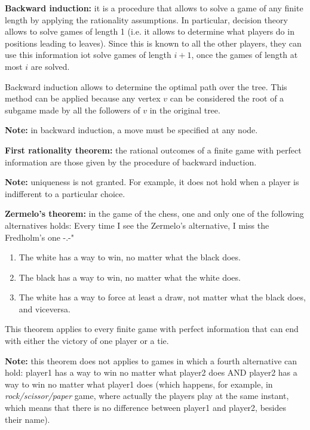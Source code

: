 \documentclass[pt11,a4paper,twoside,reqno,openright]{paper}
\begin{document}
\bigskip
\noindent \textbf{Backward induction:} it is a procedure that allows to solve 
a game of any finite length by applying the rationality assumptions. In 
particular, decision theory allows to solve games of length 1 (i.e. it allows 
to determine what players do in positions leading to leaves). Since this is 
known to all the other players, they can use this information iot solve games 
of length $i+1$, once the games of length at most $i$ are solved.

\noindent Backward induction allows to determine the optimal path over the tree. 
This method can be applied because any vertex $v$ can be considered the root of 
a subgame made by all the followers of $v$ in the original tree.

\noindent \textbf{Note:} in backward induction, a move must be specified at any 
node.

\bigskip
\noindent \textbf{First rationality theorem:} the rational outcomes of a finite 
game with perfect information are those given by the procedure of backward 
induction.

\noindent \textbf{Note:} uniqueness is not granted. For example, it does not 
hold when a player is indifferent to a particular choice.

\bigskip
\noindent \textbf{Zermelo's theorem:} in the game of the chess, one and only 
one of the following alternatives holds: {\huge Every time I see the Zermelo's 
alternative, I miss the Fredholm's one -.-"}
\begin{enumerate}
	\item The white has a way to win, no matter what the black does.
	\item The black has a way to win, no matter what the white does.
	\item The white has a way to force at least a draw, not matter what the 
	black does, and viceversa.
\end{enumerate}
This theorem applies to every finite game with perfect information 
that can end with either the victory of one player or a tie.

\noindent \textbf{Note:} this theorem does not applies to games in which a 
fourth alternative can hold: player1 has a way to win no matter what player2 
does AND player2 has a way to win no matter what player1 does (which 
happens, for example, in \textit{rock/scissor/paper} game, where actually 
the players play at the same instant, which means that there is no difference 
between player1 and player2, besides their name).
\end{document}
